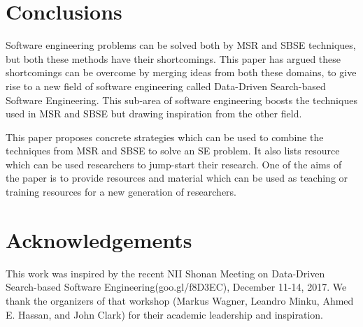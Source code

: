 \documentclass[sigconf,anonymous,review]{acmart}
\begin{document}
\section{Conclusions}
Software engineering problems can be solved both by MSR and SBSE techniques, but both these methods have their shortcomings. This paper has argued these shortcomings can be overcome by merging ideas from both these domains, to give rise to a new field of software engineering called Data-Driven Search-based Software Engineering. This sub-area of software engineering boosts the techniques used in MSR and SBSE but drawing inspiration from the other field. 

This paper proposes concrete strategies which can be used to combine the techniques from MSR and SBSE to solve an SE problem. It also lists resource which can be used researchers to jump-start their research. One of the aims of the paper is to provide resources and material which can be used as teaching or training resources for a new generation of researchers. 

% 
% 

\section*{Acknowledgements}
This work was inspired by the recent
 NII Shonan Meeting on Data-Driven Search-based Software Engineering(goo.gl/f8D3EC), December 11-14, 2017.
We thank the organizers of that workshop 
(Markus Wagner,  
 Leandro Minku,  
 Ahmed E. Hassan, and 
 John Clark)
for their academic
leadership and inspiration.

 

 
\end{document}
